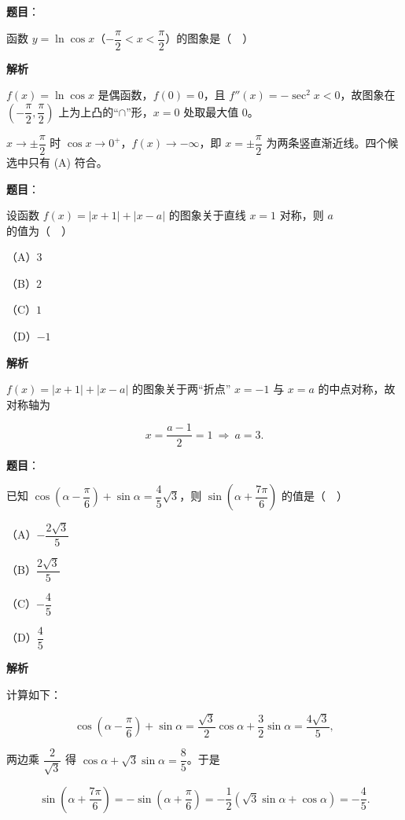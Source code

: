 \begin{answer}

\textbf{题目}：

函数 $y=\ln\cos x$（$-\dfrac{\pi}{2}<x<\dfrac{\pi}{2}$）的图象是（　）
\nopagebreak[4]
\begin{center}\end{center}
\nopagebreak[4]
\textbf{解析}

$f(x)=\ln\cos x$ 是偶函数，$f(0)=0$，且 $f''(x)=-\sec^2x<0$，故图象在 $\left(-\dfrac{\pi}{2},\dfrac{\pi}{2}\right)$ 上为上凸的“$\cap$”形，$x=0$ 处取最大值 $0$。

$x\to\pm\dfrac{\pi}{2}$ 时 $\cos x\to0^+$，$f(x)\to-\infty$，即 $x=\pm\dfrac{\pi}{2}$ 为两条竖直渐近线。四个候选中只有 (A) 符合。


\end{answer}
\begin{answer}

\textbf{题目}：

设函数 $f(x)=|x+1|+|x-a|$ 的图象关于直线 $x=1$ 对称，则 $a$ 的值为（　）

（A）$3$

（B）$2$

（C）$1$

（D）$-1$

\textbf{解析}

$f(x)=|x+1|+|x-a|$ 的图象关于两“折点” $x=-1$ 与 $x=a$ 的中点对称，故对称轴为

\nopagebreak[4]
\[x=\frac{a-1}2=1\ \Longrightarrow\ a=3.\]


\end{answer}
\begin{answer}

\textbf{题目}：

已知 $\cos\left(\alpha-\dfrac{\pi}{6}\right)+\sin\alpha=\dfrac45\sqrt3$，则 $\sin\left(\alpha+\dfrac{7\pi}{6}\right)$ 的值是（　）

（A）$-\dfrac{2\sqrt3}5$

（B）$\dfrac{2\sqrt3}5$

（C）$-\dfrac45$

（D）$\dfrac45$

\textbf{解析}

计算如下：

\nopagebreak[4]
\[\cos\left(\alpha-\frac{\pi}6\right)+\sin\alpha=\frac{\sqrt3}2\cos\alpha+\frac32\sin\alpha=\frac{4\sqrt3}5,\]

两边乘 $\dfrac2{\sqrt3}$ 得 $\cos\alpha+\sqrt3\sin\alpha=\dfrac85$。于是

\nopagebreak[4]
\[\sin\left(\alpha+\frac{7\pi}6\right)=-\sin\left(\alpha+\frac{\pi}6\right)=-\frac12\left(\sqrt3\sin\alpha+\cos\alpha\right)=-\frac45.\]


\end{answer}
